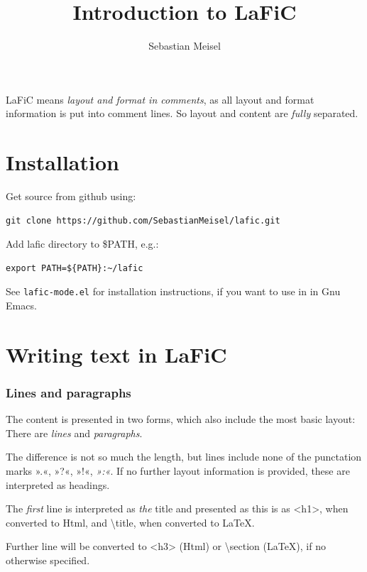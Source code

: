 \documentclass{article}
\title{Introduction to LaFiC}
\author{Sebastian Meisel}
\begin{document}
\maketitle


LaFiC means \textit{layout and format in comments}, as all layout and
format information is put into comment lines. So layout and
content are \emph{fully} separated.

\part{Installation}

Get source from github using:

\begin{verbatim}
git clone https://github.com/SebastianMeisel/lafic.git

\end{verbatim}

Add lafic directory to \$PATH, e.g.:

\begin{verbatim}
export PATH=${PATH}:~/lafic

\end{verbatim}

See \texttt{lafic-mode.el} for installation instructions, if you want
to use in in Gnu Emacs.

\part{Writing text in LaFiC}

\section{Lines and paragraphs}

The content is presented in two forms, which also include
the most basic layout: There are \emph{lines} and \emph{paragraphs}.

The difference is not so much the length, but lines include
none of the punctation marks ».«, »?«, »!«, \emph{»:«}. If no
further layout information is provided, these are
interpreted as headings.

The \emph{first} line is interpreted as \emph{the} title and presented as
this is as <h1>, when converted to Html, and \textbackslash title, when 
converted to \LaTeX.

Further line will be converted to <h3> (Html) or \textbackslash section
(\LaTeX), if no otherwise specified.
\end{document}
